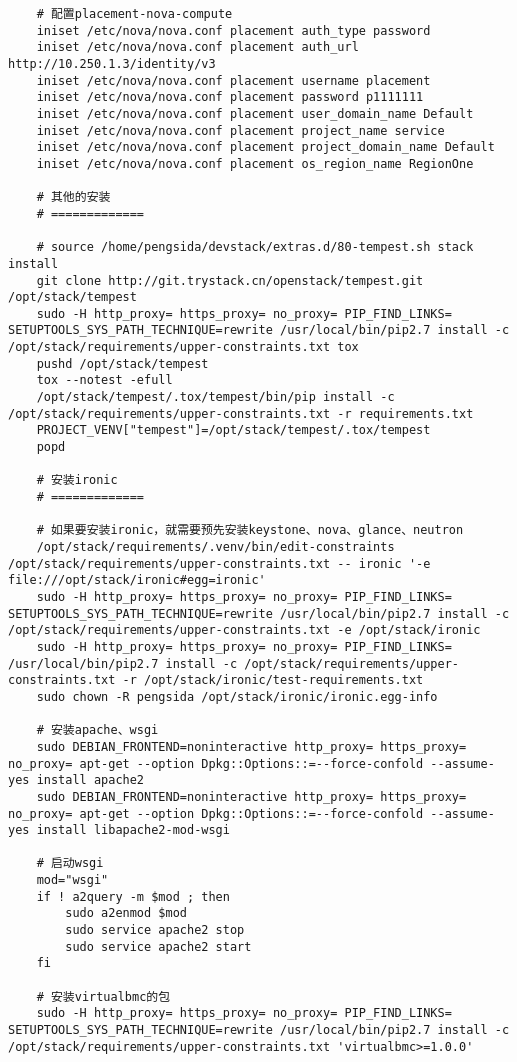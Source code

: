 \documentclass[a4paper,left=1.5cm,right=1.5cm,11pt]{article}
\begin{document}
\begin{lstlisting}
	# 配置placement-nova-compute
	iniset /etc/nova/nova.conf placement auth_type password
    iniset /etc/nova/nova.conf placement auth_url http://10.250.1.3/identity/v3
    iniset /etc/nova/nova.conf placement username placement
    iniset /etc/nova/nova.conf placement password p1111111
    iniset /etc/nova/nova.conf placement user_domain_name Default
    iniset /etc/nova/nova.conf placement project_name service
    iniset /etc/nova/nova.conf placement project_domain_name Default
    iniset /etc/nova/nova.conf placement os_region_name RegionOne

	# 其他的安装
	# =============

	# source /home/pengsida/devstack/extras.d/80-tempest.sh stack install
	git clone http://git.trystack.cn/openstack/tempest.git /opt/stack/tempest
	sudo -H http_proxy= https_proxy= no_proxy= PIP_FIND_LINKS= SETUPTOOLS_SYS_PATH_TECHNIQUE=rewrite /usr/local/bin/pip2.7 install -c /opt/stack/requirements/upper-constraints.txt tox
	pushd /opt/stack/tempest
	tox --notest -efull
	/opt/stack/tempest/.tox/tempest/bin/pip install -c /opt/stack/requirements/upper-constraints.txt -r requirements.txt	
	PROJECT_VENV["tempest"]=/opt/stack/tempest/.tox/tempest
	popd

	# 安装ironic
	# =============

	# 如果要安装ironic，就需要预先安装keystone、nova、glance、neutron
	/opt/stack/requirements/.venv/bin/edit-constraints /opt/stack/requirements/upper-constraints.txt -- ironic '-e file:///opt/stack/ironic#egg=ironic'
	sudo -H http_proxy= https_proxy= no_proxy= PIP_FIND_LINKS= SETUPTOOLS_SYS_PATH_TECHNIQUE=rewrite /usr/local/bin/pip2.7 install -c /opt/stack/requirements/upper-constraints.txt -e /opt/stack/ironic
	sudo -H http_proxy= https_proxy= no_proxy= PIP_FIND_LINKS= /usr/local/bin/pip2.7 install -c /opt/stack/requirements/upper-constraints.txt -r /opt/stack/ironic/test-requirements.txt
	sudo chown -R pengsida /opt/stack/ironic/ironic.egg-info

	# 安装apache、wsgi
	sudo DEBIAN_FRONTEND=noninteractive http_proxy= https_proxy= no_proxy= apt-get --option Dpkg::Options::=--force-confold --assume-yes install apache2
	sudo DEBIAN_FRONTEND=noninteractive http_proxy= https_proxy= no_proxy= apt-get --option Dpkg::Options::=--force-confold --assume-yes install libapache2-mod-wsgi

	# 启动wsgi
	mod="wsgi"
	if ! a2query -m $mod ; then
		sudo a2enmod $mod
		sudo service apache2 stop
		sudo service apache2 start
	fi

	# 安装virtualbmc的包
	sudo -H http_proxy= https_proxy= no_proxy= PIP_FIND_LINKS= SETUPTOOLS_SYS_PATH_TECHNIQUE=rewrite /usr/local/bin/pip2.7 install -c /opt/stack/requirements/upper-constraints.txt 'virtualbmc>=1.0.0'


\end{lstlisting}
\end{document}
